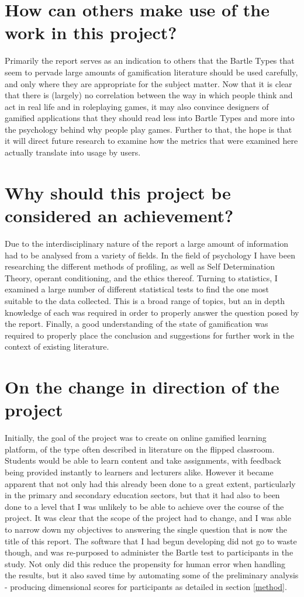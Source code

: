 \documentclass[12pt,a4paper,twoside]{report}
\begin{document}
\section{How can others make use of the work in this project?}
Primarily the report serves as an indication to others that the Bartle Types that seem to pervade large amounts of gamification literature should be used carefully, and only where they are appropriate for the subject matter. Now that it is clear that there is (largely) no correlation between the way in which people think and act in real life and in roleplaying games, it may also convince designers of gamified applications that they should read less into Bartle Types and more into the psychology behind why people play games. Further to that, the hope is that it will direct future research to examine how the metrics that were examined here actually translate into usage by users.

\section{Why should this project be considered an achievement?}
Due to the interdisciplinary nature of the report a large amount of information had to be analysed from a variety of fields. In the field of psychology I have been researching the different methods of profiling, as well as Self Determination Theory, operant conditioning, and the ethics thereof. Turning to statistics, I examined a large number of different statistical tests to find the one most suitable to the data collected. This is a broad range of topics, but an in depth knowledge of each was required in order to properly answer the question posed by the report. Finally, a good understanding of the state of gamification was required to properly place the conclusion and suggestions for further work in the context of existing literature.

\section{On the change in direction of the project}
Initially, the goal of the project was to create on online gamified learning platform, of the type often described in literature on the flipped classroom. Students would be able to learn content and take assignments, with feedback being provided instantly to learners and lecturers alike. However it became apparent that not only had this already been done to a great extent, particularly in the primary and secondary education sectors, but that it had also to been done to a level that I was unlikely to be able to achieve over the course of the project. It was clear that the scope of the project had to change, and I was able to narrow down my objectives to answering the single question that is now the title of this report. The software that I had begun developing did not go to waste though, and was re-purposed to administer the Bartle test to participants in the study. Not only did this reduce the propensity for human error when handling the results, but it also saved time by automating some of the preliminary analysis - producing dimensional scores for participants as detailed in section \ref{method}.
\end{document}
